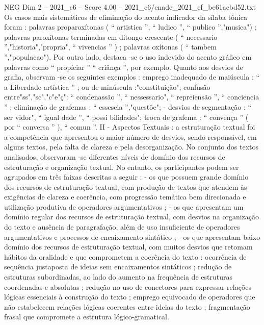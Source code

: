 \begin{textsample}{NEG Dim 2 – 2021\_c6 – Score 4.00 – 2021\_c6/enade\_2021\_ef\_be61acbd52.txt}
Os casos mais sistemáticos de eliminação do acento indicador da sílaba tônica foram : palavras proparoxítonas ( “ artistica ”, “ ludico ”, “ publico ”,"musica") ; palavras paroxítonas terminadas em ditongo crescente ( “ necessario ”,"historia","propria", “ vivencias ” ) ; palavras oxítonas ( “ tambem ”,"populacao").
Por outro lado, destaca -se o uso indevido do acento gráfico em palavras como “ propíciar ” “ criânça ”, por exemplo.
Quanto aos desvios de grafia, observam -se os seguintes exemplos : emprego inadequado de maiúscula : “ a Liberdade artística ” ; ou de minúscula :"constituição"; confusão entre"ss","sc","c"e"ç": “ condenassão ”, “ nessessario", “ repreiensão ”, “ conciencia ” ; eliminação de grafemas : “ essescia ”,"questõe"; - desvios de segmentação : “ ser vidor", “ igual dade ”, “ possi bilidades"; troca de grafema : “ convença ” ( por “ conversa ” ), “ comun ”.
II - Aspectos Textuais : a estruturação textual foi a competência que apresentou o maior número de desvios, sendo responsável, em alguns textos, pela falta de clareza e pela desorganização.
No conjunto dos textos analisados, observaram -se diferentes níveis de domínio dos recursos de estruturação e organização textual.
No entanto, os participantes podem ser agrupados em três faixas descritas a seguir : - os que possuem grande domínio dos recursos de estruturação textual, com produção de textos que atendem às exigências de clareza e coerência, com progressão temática bem direcionada e utilização produtiva de operadores argumentativos ; - os que apresentam um domínio regular dos recursos de estruturação textual, com desvios na organização do texto e ausência de paragrafação, além de uso insuficiente de operadores argumentativos e processos de encaixamento sintático ; - os que apresentam baixo domínio dos recursos de estruturação textual, com muitos desvios que retomam hábitos da oralidade e que comprometem a coerência do texto : ocorrência de sequência justaposta de ideias sem encaixamentos sintáticos ; redução de estruturas subordinadas, ao lado do aumento na frequência de estruturas coordenadas e absolutas ; redução no uso de conectores para expressar relações lógicas essenciais à construção do texto ; emprego equivocado de operadores que não estabelecem relações lógicas coerentes entre ideias do texto ; fragmentação frasal que compromete a estrutura lógico-gramatical.

\end{textsample}
